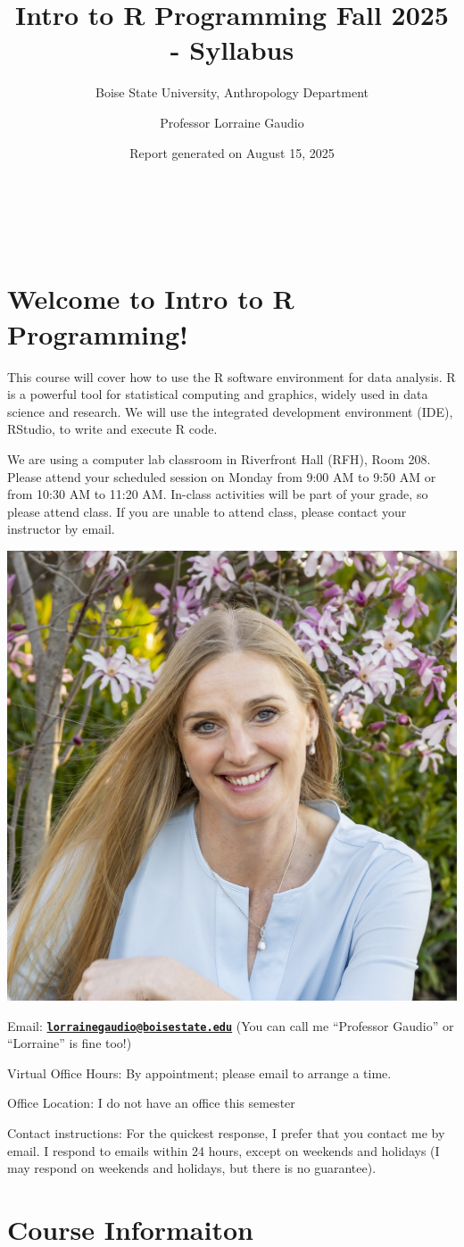 \documentclass[
  12pt,
]{scrreprt}
\title{Intro to R Programming Fall 2025 - Syllabus}
\subtitle{Boise State University, Anthropology Department}
\author{Professor Lorraine Gaudio}
\date{Report generated on August 15, 2025}
\renewcommand{\maketitle}{
  \thispagestyle{titlepage}  %
  \begin{center}
    \vspace*{3cm}
    {\Huge\sffamily\bfseries\color{boisestateblue}\thetitle}\\[4cm]

    \vspace*{1cm}
    {\Large\sffamily\color{boisestateblue}\theauthor}\\[0.5cm]
    {\large\sffamily\color{boisestateblue}\thedate}
  \end{center}
  \clearpage
  \thispagestyle{empty}  %
  \pagenumbering{arabic}
  \setcounter{page}{1}
}
\begin{document}
\maketitle

{
\hypersetup{linkcolor=}
\setcounter{tocdepth}{2}
\tableofcontents
}
\chapter{Welcome to Intro to R
Programming!}\label{welcome-to-intro-to-r-programming}

This course will cover how to use the R software environment for data
analysis. R is a powerful tool for statistical computing and graphics,
widely used in data science and research. We will use the integrated
development environment (IDE), RStudio, to write and execute R code.

We are using a computer lab classroom in Riverfront Hall (RFH), Room
208. Please attend your scheduled session on Monday from 9:00 AM to 9:50
AM or from 10:30 AM to 11:20 AM. In-class activities will be part of
your grade, so please attend class. If you are unable to attend class,
please contact your instructor by email.

\begin{center}\includegraphics[width=0.25\linewidth]{../images/DSC_0624_sqre} \end{center}

Email:
\textbf{\href{mailto:lorrainegaudio@boisestate.edu}{\nolinkurl{lorrainegaudio@boisestate.edu}}}
(You can call me ``Professor Gaudio'' or ``Lorraine'' is fine too!)

Virtual Office Hours: By appointment; please email to arrange a time.

Office Location: I do not have an office this semester

Contact instructions: For the quickest response, I prefer that you
contact me by email. I respond to emails within 24 hours, except on
weekends and holidays (I may respond on weekends and holidays, but there
is no guarantee).

\chapter{Course Informaiton}\label{course-informaiton}
\end{document}
